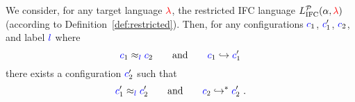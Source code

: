 \documentclass{sigplanconf}
\newcommand{\Red}[1]{{\color{red} #1}}
\begin{document}
\begin{lemma}
  \label{lemma:rr-tsni-general}
  We consider, for any target language \ensuremath{\Red{\lambda}},
  the restricted IFC language \ensuremath{L_\text{IFC}^{\mathcal{P}}(\alpha,\Red{\lambda})}
  (according to Definition~\ref{def:restricted}).
  Then,
  for any configurations \ensuremath{\ifc{c}_{1}}, \ensuremath{\ifc{c}_{1}'}, \ensuremath{\ifc{c}_{2}}, and label \ensuremath{\ifc{l}} where
  \begin{equation} \label{eq:tsni-lemma-lhs}
  {\color{blue} c}_{1} \approx_{{\color{blue} l}} {\color{blue} c}_{2}
  \qquad \text{and} \qquad
  {\color{blue} c}_{1} \hookrightarrow {\color{blue} c}_{1}'
  \end{equation}
  there exists a configuration \ensuremath{\ifc{c}_{2}'} such that
  \begin{equation} \label{eq:tsni-lemma-rhs}
  {\color{blue} c}_{1}' \approx_{{\color{blue} l}} {\color{blue} c}_{2}'
  \qquad \text{and} \qquad
  {\color{blue} c}_{2} \hookrightarrow^* {\color{blue} c}_{2}'
  \ \text{.}
  \end{equation}
\end{lemma}
\end{document}
